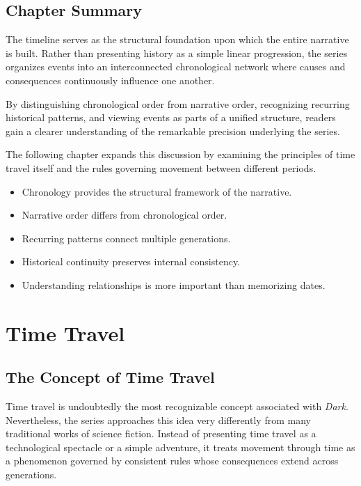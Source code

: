 \documentclass[12pt,oneside,openany]{book}
\begin{document}
\section{Chapter Summary}

The timeline serves as the structural foundation upon which the entire
narrative is built. Rather than presenting history as a simple linear
progression, the series organizes events into an interconnected chronological
network where causes and consequences continuously influence one another.

By distinguishing chronological order from narrative order, recognizing
recurring historical patterns, and viewing events as parts of a unified
structure, readers gain a clearer understanding of the remarkable precision
underlying the series.

The following chapter expands this discussion by examining the principles of
time travel itself and the rules governing movement between different periods.

\begin{tcolorbox}[colback=orange!8,colframe=orange!70!black,title=Chapter Takeaways]
\begin{itemize}
\item Chronology provides the structural framework of the narrative.
\item Narrative order differs from chronological order.
\item Recurring patterns connect multiple generations.
\item Historical continuity preserves internal consistency.
\item Understanding relationships is more important than memorizing dates.
\end{itemize}
\end{tcolorbox}
\chapter{Time Travel}
\section{The Concept of Time Travel}

Time travel is undoubtedly the most recognizable concept associated with
\textit{Dark}. Nevertheless, the series approaches this idea very differently
from many traditional works of science fiction. Instead of presenting time
travel as a technological spectacle or a simple adventure, it treats movement
through time as a phenomenon governed by consistent rules whose consequences
extend across generations.
\end{document}
